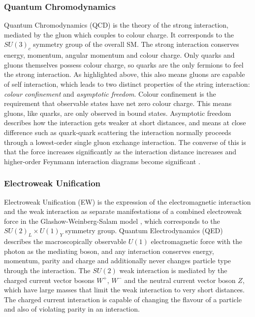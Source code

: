 		\newpage
		\subsubsection{Quantum Chromodynamics}

		Quantum Chromodynamics (QCD) is the theory of the strong interaction, mediated by the gluon which couples to colour charge. It corresponds to the $SU(3)_c$ symmetry group of the overall SM. The strong interaction conserves energy, momentum, angular momentum and colour charge. Only quarks and gluons themselves possess colour charge, so quarks are the only fermions to feel the strong interaction. As highlighted above, this also means gluons are capable of self interaction, which leads to two distinct properties of the string interaction: \textit{colour confinement} and \textit{asymptotic freedom}. Colour confinement is the requirement that observable states have net zero colour charge. This means gluons, like quarks, are only observed in bound states. Asymptotic freedom describes how the interaction gets weaker at short distances, and means at close difference such as quark-quark scattering the interaction normally proceeds through a lowest-order single gluon exchange interaction. The converse of this is that the force increases significantly as the interaction distance increases and higher-order Feynmann interaction diagrams become significant \cite{martinshaw}.

		\subsubsection{Electroweak Unification}

		Electroweak Unification (EW) is the expression of the electromagnetic interaction and the weak interaction as separate manifestations of a combined electroweak force in the Glashow-Weinberg-Salam model \cite{gws-g, gws-w, gws-s}, which corresponds to the $SU(2)_L\times U(1)_Y$ symmetry group. Quantum Electrodynamics (QED) describes the macroscopically observable $U(1)$ electromagnetic force  with the photon as the mediating boson, and any interaction conserves energy, momentum, parity and charge and additionally never changes particle type through the interaction. The $SU(2)$ weak interaction is mediated by the charged current vector bosons $W^+$, $W^-$ and the neutral current vector boson $Z$, which have large masses that limit the weak interaction to very short distances. The charged current interaction is capable of changing the flavour of a particle and also of violating parity in an interaction.

